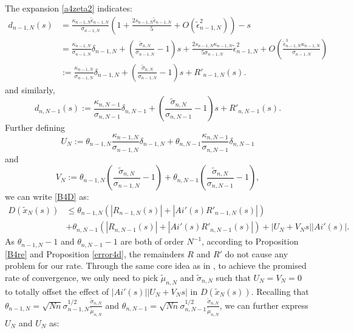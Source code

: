 \documentclass[11pt]{article}
\numberwithin{equation}{section}%
\numberwithin{theorem}{section}
\begin{document}
The expansion \eqref{a4zeta2} indicates:
\begin{equation}\label{a4D}
    \begin{split}
        d_{n-1,N}(s)&=\frac{\kappa_{n-1,N}\tilde{\epsilon}_{n-1,N}}{\sigma_{n-1,N}}\left(1+\frac{2s_{n-1,N}\tilde{\epsilon}_{n-1,N}}{5}+O\left(\tilde{\epsilon}_{n-1,N}^2\right)\right)-s\\
        &=\frac{\kappa_{n-1,N}}{\sigma_{n-1,N}}\delta_{n-1,N}+\left(\frac{\tilde{\sigma}_{n,N}}{\sigma_{n-1,N}}-1\right)s+\frac{2s_{n-1,N}\kappa_{n-1,N}}{5\sigma_{n-1,N}}\tilde{\epsilon}^2_{n-1,N}+O\left(\frac{\tilde{\epsilon}^3_{n-1,N}\kappa_{n-1,N}}{\sigma_{n-1,N}}\right)\\
        &:=\frac{\kappa_{n-1,N}}{\sigma_{n-1,N}}\delta_{n-1,N}+\left(\frac{\tilde{\sigma}_{n,N}}{\sigma_{n-1,N}}-1\right)s+R'_{n-1,N}(s).
    \end{split}
\end{equation}
and similarly,
\begin{equation*}
    d_{n,N-1}(s):=\frac{\kappa_{n,N-1}}{\sigma_{n,N-1}}\delta_{n,N-1}+\left(\frac{\tilde{\sigma}_{n,N}}{\sigma_{n,N-1}}-1\right)s+R'_{n,N-1}(s).
\end{equation*}
Further defining
\begin{equation*}
    U_N:=\theta_{n-1,N}\frac{\kappa_{n-1,N}}{\sigma_{n-1,N}}\delta_{n-1,N}+\theta_{n,N-1}\frac{\kappa_{n,N-1}}{\sigma_{n,N-1}}\delta_{n,N-1}
\end{equation*}
and
\begin{equation*}
    V_N:=\theta_{n-1,N}\left(\frac{\tilde{\sigma}_{n,N}}{\sigma_{n-1,N}}-1\right)+\theta_{n,N-1}\left(\frac{\tilde{\sigma}_{n,N}}{\sigma_{n,N-1}}-1\right),
\end{equation*}
we can write \eqref{B4D} as:
\begin{equation*}
\begin{split}
      D(\tilde{x}_N(s))&\le
    \theta_{n-1,N}\left(|R_{n-1,N}(s)|+|Ai'(s)R'_{n-1,N}(s)|\right)\\&+\theta_{n,N-1}\left(|R_{n,N-1}(s)|+|Ai'(s)R'_{n,N-1}(s)|\right)+|U_N+V_Ns||Ai'(s)|.
\end{split}
\end{equation*}
As $\theta_{n-1,N}-1$ and $\theta_{n,N-1}-1$ are both of order $N^{-1}$, according to Proposition \ref{B4re} and Proposition \ref{error4d}, the remainders $R$ and $R'$ do not cause any problem for our rate. Through the same core idea as in \cite{el2006rate}, to achieve the promised rate of convergence, we only need to pick $\tilde{\mu}_{n,N}$ and $\tilde{\sigma}_{n,N}$ such that $U_N=V_N=0$ to totally offset the effect of $|Ai'(s)||U_N+V_Ns|$ in $D(\tilde{x}_N(s))$. Recalling that $\theta_{n-1,N}=\sqrt{Nn}\sigma_{n-1,N}^{1/2}\frac{\tilde{\sigma}_{n,N}}{\tilde{\mu}_{n,N}}$ and $\theta_{n,N-1}=\sqrt{Nn}\sigma_{n,N-1}^{1/2}\frac{\tilde{\sigma}_{n,N}}{\tilde{\mu}_{n,N}}$, we can further express $U_N$ and $U_N$ as:
\end{document}
